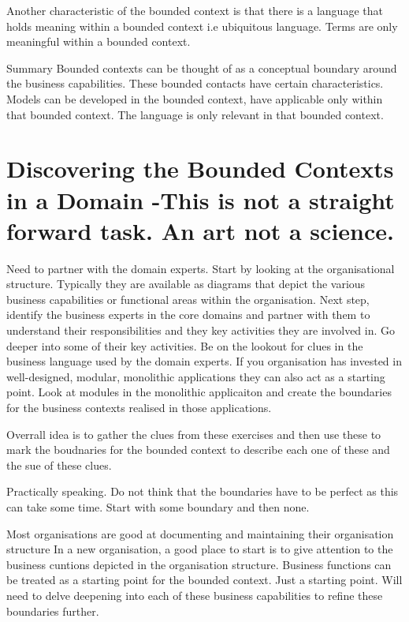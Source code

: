 \documentclass[a4paper, 11pt]{book}
\begin{document}
    Another characteristic of the bounded context is that there is a language that holds meaning within a bounded context i.e ubiquitous language.
    Terms are only meaningful within a bounded context.

    Summary
    Bounded contexts can be thought of as a conceptual boundary around the business capabilities.
    These bounded contacts have certain characteristics.
    Models can be developed in the bounded context, have applicable only within that bounded context.
    The language is only relevant in that bounded context.


    \section{Discovering the Bounded Contexts in a Domain -This is not a straight forward task. An art not a science.}

    Need to partner with the domain experts.
    Start by looking at the organisational structure.
    Typically they are available as diagrams that depict the various business capabilities or functional areas within the organisation.
    Next step, identify the business experts in the core domains and partner with them to understand their responsibilities and they key activities they are involved in.
    Go deeper into some of their key activities.
    Be on the lookout for clues in the business language used by the domain experts.
    If you organisation has invested in well-designed, modular, monolithic applications they can also act as a starting point.
    Look at modules in the monolithic applicaiton and create the boundaries for the business contexts realised in those applications.

    Overrall idea is to gather the clues from these exercises and then use these to mark the boudnaries for the bounded context to describe each one of these and the sue of these clues.

    Practically speaking. Do not think that the boundaries have to be perfect as this can take some time.
    Start with some boundary and then none.

    Most organisations are good at documenting and maintaining their organisation structure
    In a new organisation, a good place to start is to give attention to the business cuntions depicted in the organisation structure.
    Business functions can be treated as a starting point for the bounded context.
    Just a starting point.
    Will need to delve deepening into each of these business capabilities to refine these boundaries further.
\end{document}
